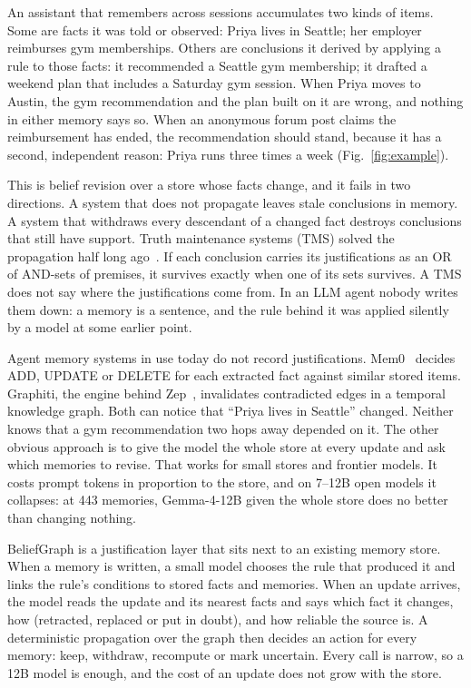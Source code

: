 \documentclass[conference]{IEEEtran}
\begin{document}
An assistant that remembers across sessions accumulates two kinds of items. Some are facts it was told or observed: Priya lives in Seattle; her employer reimburses gym memberships. Others are conclusions it derived by applying a rule to those facts: it recommended a Seattle gym membership; it drafted a weekend plan that includes a Saturday gym session. When Priya moves to Austin, the gym recommendation and the plan built on it are wrong, and nothing in either memory says so. When an anonymous forum post claims the reimbursement has ended, the recommendation should stand, because it has a second, independent reason: Priya runs three times a week (Fig.~\ref{fig:example}).

This is belief revision over a store whose facts change, and it fails in two directions. A system that does not propagate leaves stale conclusions in memory. A system that withdraws every descendant of a changed fact destroys conclusions that still have support. Truth maintenance systems (TMS) solved the propagation half long ago~\cite{doyle1979,dekleer1986}. If each conclusion carries its justifications as an OR of AND-sets of premises, it survives exactly when one of its sets survives. A TMS does not say where the justifications come from. In an LLM agent nobody writes them down: a memory is a sentence, and the rule behind it was applied silently by a model at some earlier point.

Agent memory systems in use today do not record justifications. Mem0~\cite{chhikara2025mem0} decides ADD, UPDATE or DELETE for each extracted fact against similar stored items. Graphiti, the engine behind Zep~\cite{rasmussen2025zep}, invalidates contradicted edges in a temporal knowledge graph. Both can notice that ``Priya lives in Seattle'' changed. Neither knows that a gym recommendation two hops away depended on it. The other obvious approach is to give the model the whole store at every update and ask which memories to revise. That works for small stores and frontier models. It costs prompt tokens in proportion to the store, and on 7--12B open models it collapses: at 443 memories, Gemma-4-12B given the whole store does no better than changing nothing.

BeliefGraph is a justification layer that sits next to an existing memory store. When a memory is written, a small model chooses the rule that produced it and links the rule's conditions to stored facts and memories. When an update arrives, the model reads the update and its nearest facts and says which fact it changes, how (retracted, replaced or put in doubt), and how reliable the source is. A deterministic propagation over the graph then decides an action for every memory: keep, withdraw, recompute or mark uncertain. Every call is narrow, so a 12B model is enough, and the cost of an update does not grow with the store.
\end{document}
